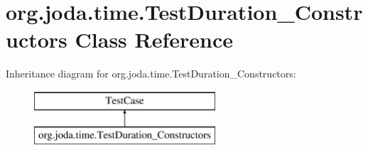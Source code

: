 \hypertarget{classorg_1_1joda_1_1time_1_1_test_duration___constructors}{\section{org.\-joda.\-time.\-Test\-Duration\-\_\-\-Constructors Class Reference}
\label{classorg_1_1joda_1_1time_1_1_test_duration___constructors}
}
Inheritance diagram for org.\-joda.\-time.\-Test\-Duration\-\_\-\-Constructors\-:\begin{figure}[H]
\begin{center}
\leavevmode
\includegraphics[height=2.000000cm]{classorg_1_1joda_1_1time_1_1_test_duration___constructors}
\end{center}
\end{figure}
